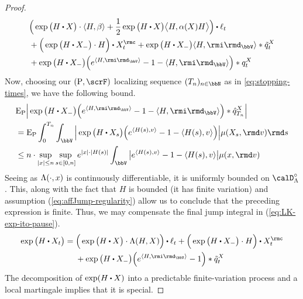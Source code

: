 \begin{proof}
\begin{align}
\begin{aligned}[t]
      &\Big(\exp\big( H \shortInt \X \big) \cdot \prj{H}{\affDrift} 
      + \frac12 \exp\big( H \shortInt \X \big) \bprj{H}{\affDiff(\X)H} \Big) \shortInt \leb_t \\
      &+ \Big( \exp\big( H \shortInt \X_- \big) \cdot H \Big) \shortInt \X^\rmc_t 
      + \exp\big( H \shortInt \X_- \big) \prj{H}{\id_\vecSpace} \ast \compensate{\jumpMeas^\X}_t \\
      &+ \exp\big(H\shortInt\X_-\big) \Big( e^{\prj{H}{\id_\vecSpace}} - 1 - \prj{H}{\id_\vecSpace} \Big) \ast \jumpMeas^\X_t
    \end{aligned} 
  \end{align}
  Now, choosing our $(\Prb, \scrF)$ localizing sequence $(T_n)_{n\in\bbN}$ as in \ref{eq:stopping-times}, we have the following bound.
  \begin{align*}
    &\Exp_\Prb \Big| \exp\big(H \shortInt \X_- \big) \Big(e^\prj{H}{\id_\vecSpace} - 1 - \prj{H}{\id_\vecSpace} \Big) \ast \predproj{\jumpMeas^\X}_{T_n} \Big| \\
    &= \Exp_\Prb \int_0^{T_n} \int_\vecSpace \Big| \exp\big(H \shortInt \X_s \big) \Big( e^\prj{H(s)}{\markVar} - 1 - \prj{H(s)}{\markVar} \Big) \Big| \affJump(\X_s, \rmd\markVar) \rmd s \\
    &\leq n \cdot \sup_{|\stateVar| \leq n} \sup_{s \in [0,n]} e^{|\stateVar|\cdot|H(s)|} \int_\vecSpace \big| e^\prj{H(s)}{\markVar} - 1 - \prj{H(s)}{\markVar} \big| \affJump(\stateVar, \rmd\markVar) 
  \end{align*}
  Seeing as $\Lambda(\cdot, x)$ is continuously differentiable, it is uniformly bounded on $\odeSpace^\circ$.
  This, along with the fact that $H$ is bounded (it has finite variation) and assumption (\ref{eq:affJump-regularity}) allow us to conclude that the preceding expression is finite.
  Thus, we may compensate the final jump integral in (\ref{eq:LK-exp-ito-pause}).
  \begin{equation}
    \label{eq:jump-diffusion-exponentially-special}
    \exp\big( H \shortInt \X_t \big) 
    = \begin{aligned}[t]
      &\Big(\exp\big( H \shortInt \X \big) \cdot \ode(H, \X) \Big) \shortInt \leb_t + \Big( \exp\big( H \shortInt \X_- \big) \cdot H \Big) \shortInt \X^\rmc_t \\
      &+ \exp\big(H\shortInt\X_-\big) \Big( e^{\prj{H}{\id_\vecSpace}} - 1 \Big) \ast \compensate{\jumpMeas^\X}_t
    \end{aligned} 
  \end{equation}
  The decomposition of $\exp(H \shortInt \X)$ into a predictable finite-variation process and a  local martingale implies that it is special.

\end{proof}
